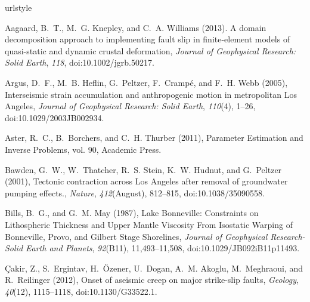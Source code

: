 \documentclass[draft,linenumbers]{AGUJournal}
\begin{document}
%
\begin{thebibliography}{52}
\providecommand{\natexlab}[1]{#1}
\expandafter\ifx\csname urlstyle\endcsname\relax
  \providecommand{\doi}[1]{doi:\discretionary{}{}{}#1}\else
  \providecommand{\doi}{doi:\discretionary{}{}{}\begingroup
  \urlstyle{rm}\Url}\fi

Aagaard, B.~T., M.~G. Knepley, and C.~A. Williams (2013). {A domain decomposition approach to implementing
fault slip in finite-element models of quasi-static and dynamic crustal deformation}, \textit{Journal of Geophysical
Research: Solid Earth}, \textit{118}, \doi{10.1002/jgrb.50217}.  
  
Argus, D.~F., M.~B. Heflin, G.~Peltzer, F.~Cramp{\'{e}}, and F.~H. Webb (2005),
  {Interseismic strain accumulation and anthropogenic motion in metropolitan
  Los Angeles}, \textit{Journal of Geophysical Research: Solid Earth},
  \textit{110}(4), 1--26, \doi{10.1029/2003JB002934}.

Aster, R.~C., B.~Borchers, and C.~H. Thurber (2011), {Parameter
  Estimation and Inverse Problems}, vol. 90, Academic Press.
  
Bawden, G.~W., W.~Thatcher, R.~S. Stein, K.~W. Hudnut, and G.~Peltzer (2001),
  {Tectonic contraction across Los Angeles after removal of groundwater pumping
  effects.}, \textit{Nature}, \textit{412}(August), 812--815,
  \doi{10.1038/35090558}.

Bills, B.~G., and G.~M. May (1987), {Lake Bonneville: Constraints on
  Lithospheric Thickness and Upper Mantle Viscosity From Isostatic Warping of
  Bonneville, Provo, and Gilbert Stage Shorelines}, \textit{Journal of
  Geophysical Research-Solid Earth and Planets}, \textit{92}(B11),
  11,493--11,508, \doi{10.1029/JB092iB11p11493}.

{\c{C}}akir, Z., S.~Ergintav, H.~{\"{O}}zener, U.~Dogan, A.~M. Akoglu,
  M.~Meghraoui, and R.~Reilinger (2012), {Onset of aseismic creep on major
  strike-slip faults}, \textit{Geology}, \textit{40}(12), 1115--1118,
  \doi{10.1130/G33522.1}.
  

\end{thebibliography}
\end{document}
